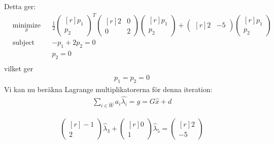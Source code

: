 Detta ger:
\begin{equation*}
\begin{aligned}
& \underset{p}{\text{minimize}}
& & \frac{1}{2}
 \begin{pmatrix*}[r]
   p_1  \\
   p_2 
\end{pmatrix*}^
 {T}
 \begin{pmatrix*}[r]
  2 & 0 \\
  0 & 2
\end{pmatrix*}
  \begin{pmatrix*}[r]
   p_1  \\
   p_2 
\end{pmatrix*}
 +
  \begin{pmatrix*}[r]
   2  &
   -5
\end{pmatrix*} 
  \begin{pmatrix*}[r]
   p_1  \\
   p_2 
\end{pmatrix*} \\
& \text{subject to}
& & 
-p_1+2p_2
= 0  \\
& & & 
p_2
= 0  \\
\end{aligned}
\end{equation*}
vilket ger
\begin{equation*}
\begin{aligned}
 p_1=p_2=0
 \end{aligned}
\end{equation*}
Vi kan nu beräkna Lagrange multiplikatorerna för denna iteration:
\begin{equation*}
\begin{aligned}
\sum_{i\in \hat{W}}a_i\hat{\lambda_i}=g=G\hat{x}+d
\end{aligned}
\end{equation*}

\begin{equation*}
\begin{aligned}
  \begin{pmatrix*}[r]
   -1  \\
   2 
\end{pmatrix*} \hat{\lambda}_3+
  \begin{pmatrix*}[r]
   0  \\
    1
\end{pmatrix*} \hat{\lambda}_5=
  \begin{pmatrix*}[r]
   2  \\
    -5
\end{pmatrix*}
\end{aligned}
\end{equation*}

